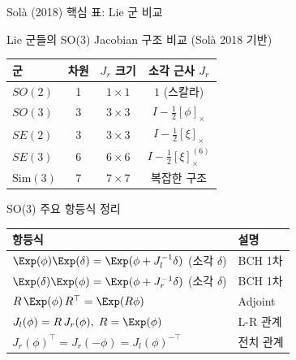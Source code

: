 \begin{frame}[shrink=5]{Solà (2018) 핵심 표: Lie 군 비교}
  \begin{block}{\small Lie 군들의 SO(3) Jacobian 구조 비교 (Solà 2018 기반)}
    \centering
    \footnotesize
    \begin{tabular}{l|ccc}
      \hline
      군 & 차원 & $J_r$ 크기 & 소각 근사 $J_r$ \\
      \hline
      $SO(2)$ & 1 & $1\times 1$ & $1$ (스칼라) \\
      $SO(3)$ & 3 & $3\times 3$ & $I - \frac{1}{2}[\phi]_\times$ \\
      $SE(2)$ & 3 & $3\times 3$ & $I - \frac{1}{2}[\xi]_\times$ \\
      $SE(3)$ & 6 & $6\times 6$ & $I - \frac{1}{2}[\xi]_\times^{(6)}$ \\
      $\mathrm{Sim}(3)$ & 7 & $7\times 7$ & 복잡한 구조 \\
      \hline
    \end{tabular}
  \end{block}
  \pause
  \begin{block}{\small SO(3) 주요 항등식 정리}
    \centering
    \footnotesize
    \renewcommand{\arraystretch}{1.4}
    \begin{tabular}{ll}
      \hline
      항등식 & 설명 \\
      \hline
      $\Exp(\phi)\Exp(\delta) = \Exp(\phi + J_l^{-1}\delta)$ (소각 $\delta$) & BCH 1차 \\
      $\Exp(\delta)\Exp(\phi) = \Exp(\phi + J_r^{-1}\delta)$ (소각 $\delta$) & BCH 1차 \\
      $R\,\Exp(\phi)\,R^\top = \Exp(R\phi)$ & Adjoint \\
      $J_l(\phi) = R\,J_r(\phi),\; R=\Exp(\phi)$ & L-R 관계 \\
      $J_r(\phi)^\top = J_r(-\phi) = J_l(\phi)^{-\top}$ & 전치 관계 \\
      \hline
    \end{tabular}
  \end{block}
\end{frame}


